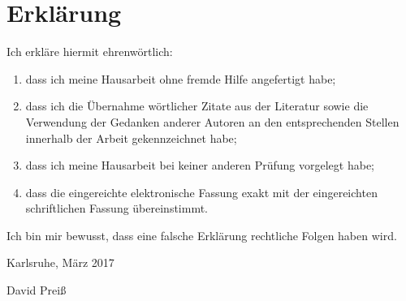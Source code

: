 \chapter*{Erklärung}
Ich erkläre hiermit ehrenwörtlich: \\
\begin{enumerate}
\item dass ich meine Hausarbeit ohne fremde Hilfe angefertigt habe;
\item dass ich die Übernahme wörtlicher Zitate aus der Literatur sowie die Verwendung der Gedanken
anderer Autoren an den entsprechenden Stellen innerhalb der Arbeit gekennzeichnet habe;
\item dass ich meine Hausarbeit bei keiner anderen Prüfung vorgelegt habe;
\item dass die eingereichte elektronische Fassung exakt mit der eingereichten schriftlichen Fassung
übereinstimmt.
\end{enumerate}

Ich bin mir bewusst, dass eine falsche Erklärung rechtliche Folgen haben wird.
\vspace{3em}

Karlsruhe, März 2017
\vspace{4em}

David Preiß